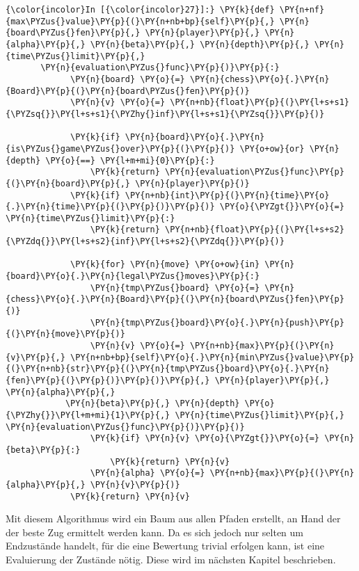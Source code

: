     \begin{Verbatim}[commandchars=\\\{\}]
{\color{incolor}In [{\color{incolor}27}]:} \PY{k}{def} \PY{n+nf}{max\PYZus{}value}\PY{p}{(}\PY{n+nb+bp}{self}\PY{p}{,} \PY{n}{board\PYZus{}fen}\PY{p}{,} \PY{n}{player}\PY{p}{,} \PY{n}{alpha}\PY{p}{,} \PY{n}{beta}\PY{p}{,} \PY{n}{depth}\PY{p}{,} \PY{n}{time\PYZus{}limit}\PY{p}{,} 
	   \PY{n}{evaluation\PYZus{}func}\PY{p}{)}\PY{p}{:}
             \PY{n}{board} \PY{o}{=} \PY{n}{chess}\PY{o}{.}\PY{n}{Board}\PY{p}{(}\PY{n}{board\PYZus{}fen}\PY{p}{)}
             \PY{n}{v} \PY{o}{=} \PY{n+nb}{float}\PY{p}{(}\PY{l+s+s1}{\PYZsq{}}\PY{l+s+s1}{\PYZhy{}inf}\PY{l+s+s1}{\PYZsq{}}\PY{p}{)}
         
             \PY{k}{if} \PY{n}{board}\PY{o}{.}\PY{n}{is\PYZus{}game\PYZus{}over}\PY{p}{(}\PY{p}{)} \PY{o+ow}{or} \PY{n}{depth} \PY{o}{==} \PY{l+m+mi}{0}\PY{p}{:}
                 \PY{k}{return} \PY{n}{evaluation\PYZus{}func}\PY{p}{(}\PY{n}{board}\PY{p}{,} \PY{n}{player}\PY{p}{)}
             \PY{k}{if} \PY{n+nb}{int}\PY{p}{(}\PY{n}{time}\PY{o}{.}\PY{n}{time}\PY{p}{(}\PY{p}{)}\PY{p}{)} \PY{o}{\PYZgt{}}\PY{o}{=} \PY{n}{time\PYZus{}limit}\PY{p}{:}
                 \PY{k}{return} \PY{n+nb}{float}\PY{p}{(}\PY{l+s+s2}{\PYZdq{}}\PY{l+s+s2}{inf}\PY{l+s+s2}{\PYZdq{}}\PY{p}{)}
         
             \PY{k}{for} \PY{n}{move} \PY{o+ow}{in} \PY{n}{board}\PY{o}{.}\PY{n}{legal\PYZus{}moves}\PY{p}{:}
                 \PY{n}{tmp\PYZus{}board} \PY{o}{=} \PY{n}{chess}\PY{o}{.}\PY{n}{Board}\PY{p}{(}\PY{n}{board\PYZus{}fen}\PY{p}{)}
                 \PY{n}{tmp\PYZus{}board}\PY{o}{.}\PY{n}{push}\PY{p}{(}\PY{n}{move}\PY{p}{)}
                 \PY{n}{v} \PY{o}{=} \PY{n+nb}{max}\PY{p}{(}\PY{n}{v}\PY{p}{,} \PY{n+nb+bp}{self}\PY{o}{.}\PY{n}{min\PYZus{}value}\PY{p}{(}\PY{n+nb}{str}\PY{p}{(}\PY{n}{tmp\PYZus{}board}\PY{o}{.}\PY{n}{fen}\PY{p}{(}\PY{p}{)}\PY{p}{)}\PY{p}{,} \PY{n}{player}\PY{p}{,} \PY{n}{alpha}\PY{p}{,} 
			\PY{n}{beta}\PY{p}{,} \PY{n}{depth} \PY{o}{\PYZhy{}}\PY{l+m+mi}{1}\PY{p}{,} \PY{n}{time\PYZus{}limit}\PY{p}{,} \PY{n}{evaluation\PYZus{}func}\PY{p}{)}\PY{p}{)}
                 \PY{k}{if} \PY{n}{v} \PY{o}{\PYZgt{}}\PY{o}{=} \PY{n}{beta}\PY{p}{:}
                     \PY{k}{return} \PY{n}{v}
                 \PY{n}{alpha} \PY{o}{=} \PY{n+nb}{max}\PY{p}{(}\PY{n}{alpha}\PY{p}{,} \PY{n}{v}\PY{p}{)}
             \PY{k}{return} \PY{n}{v}
\end{Verbatim}

    Mit diesem Algorithmus wird ein Baum aus allen Pfaden erstellt, an Hand
der der beste Zug ermittelt werden kann. Da es sich jedoch nur selten um Endzustände handelt, für
die eine Bewertung trivial erfolgen kann, ist eine Evaluierung der
Zustände nötig. Diese wird im nächsten Kapitel beschrieben.

